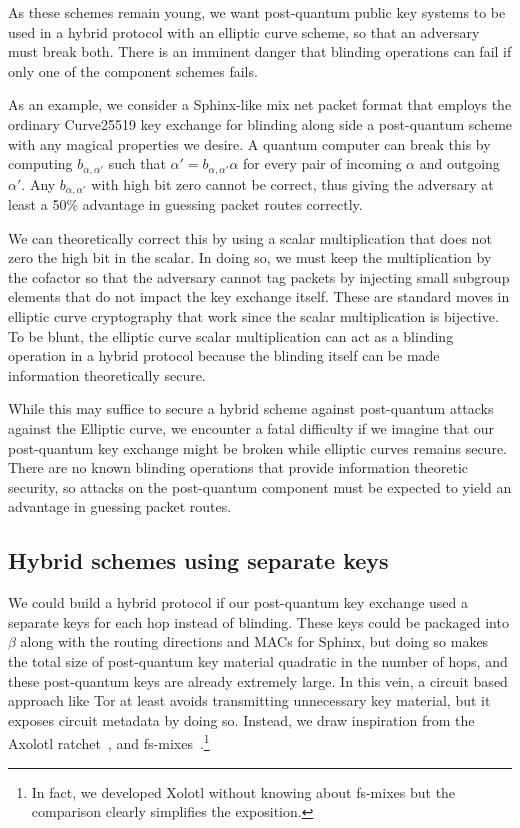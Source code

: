 \documentclass[twoside,letterpaper]{llncs}
\begin{document}
As these schemes remain young, we want post-quantum public key
systems to be used in a hybrid protocol with an elliptic curve scheme,
so that an adversary must break both.  There is an imminent danger
that blinding operations can fail if only one of the component schemes
fails.

As an example, we consider a Sphinx-like mix net packet format that
employs the ordinary Curve25519 key exchange for blinding along side
a post-quantum scheme with any magical properties we desire.  
A quantum computer can break this by computing $b_{\alpha,\alpha'}$
such that $\alpha' = b_{\alpha,\alpha'} \alpha$ for every pair of
incoming $\alpha$ and outgoing $\alpha'$.  Any $b_{\alpha,\alpha'}$
with high bit zero cannot be correct, thus giving the adversary at
least a 50\% advantage in guessing packet routes correctly.

We can theoretically correct this by using a scalar multiplication that does not
zero the high bit in the scalar.  In doing so, we must keep the
multiplication by the cofactor so that the adversary cannot tag
packets by injecting small subgroup elements that do not impact the
key exchange itself.  These are standard moves in elliptic curve 
cryptography that work since the scalar multiplication is bijective.
To be blunt, the elliptic curve scalar multiplication can act as
a blinding operation in a hybrid protocol because the blinding itself
can be made information theoretically secure.

While this may suffice to secure a hybrid scheme against post-quantum
attacks against the Elliptic curve, we encounter a fatal difficulty
if we imagine that our post-quantum key 
exchange might be broken while elliptic curves remains secure.  
There are no known blinding operations that provide information
theoretic security, so attacks on the post-quantum component must be
expected to yield an advantage in guessing packet routes.


\subsection{Hybrid schemes using separate keys}

We could build a hybrid protocol if our post-quantum key exchange
used a separate keys for each hop instead of blinding.  These keys
could be packaged into $\beta$ along with the routing directions and
MACs for Sphinx, but doing so makes the total size of post-quantum 
key material quadratic in the number of hops, and these post-quantum
keys are already extremely large.
In this vein, a circuit based approach like Tor at least avoids
transmitting unnecessary key material, but it exposes circuit
metadata by doing so. 
Instead, we draw inspiration from the Axolotl
ratchet~\cite{TextSecure}, and fs-mixes~\cite{fs-mix}.\footnote{In
  fact, we developed Xolotl without knowing about fs-mixes but the
  comparison clearly simplifies the exposition.}
\end{document}
